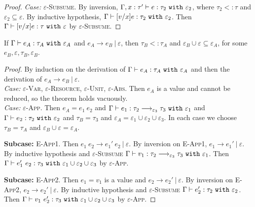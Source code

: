 \begin{appendix}
\begin{proof}
\textit{Case:} \textsc{$\varepsilon$-Subsume}. By inversion, $ \Gamma, x:  \tau' \vdash  e:  \tau_2~\mathtt{with}~ \varepsilon_2$, where $ \tau_2 <:  \tau$ and $\varepsilon_2 \subseteq \varepsilon$. By inductive hypothesis, $ \Gamma \vdash [ v/x] e:  \tau_2~\mathtt{with}~ \varepsilon_2$. Then $ \Gamma \vdash [ v/x] e:  \tau~\mathtt{with}~ \varepsilon$ by \textsc{$\varepsilon$-Subsume}.

\end{proof}


\hrulefill

\begin{theorem}
If $\Gamma \vdash e_A: \tau_A~\mathtt{with}~ \varepsilon_A$ and $e_A \longrightarrow e_B~|~\varepsilon$, then $\tau_B <: \tau_A$ and $\varepsilon_B \cup \varepsilon \subseteq \varepsilon_A$, for some $e_B, \varepsilon, \tau_B, \varepsilon_B$.
\end{theorem}


\begin{proof}
By induction on the derivation of $ \Gamma \vdash  e_A:  \tau_A~\mathtt{with}~ \varepsilon_A$ and then the derivation of $e_A \longrightarrow e_B~|~\varepsilon$.  \\

\textit{Case:} \textsc{$\varepsilon$-Var}, \textsc{$\varepsilon$-Resource}, \textsc{$\varepsilon$-Unit}, \textsc{$\varepsilon$-Abs}. Then $e_A$ is a value and cannot be reduced, so the theorem holds vacuously.\\

\textit{Case:} \textsc{$\varepsilon$-App}. Then $e_A =  e_1~ e_2$ and $\Gamma \vdash e_1:  \tau_2 \longrightarrow_{\varepsilon_3}  \tau_3~\mathtt{with}~ \varepsilon_1$ and $ \Gamma \vdash  e_2:  \tau_2~\mathtt{with}~ \varepsilon_2$ and $\tau_B = \tau_3$ and $\varepsilon_A = \varepsilon_1 \cup \varepsilon_2 \cup \varepsilon_3$.  In each case we choose $\tau_B = \tau_A$ and $\varepsilon_B \cup \varepsilon = \varepsilon_A$.

\textbf{Subcase:} \textsc{E-App1}. Then $e_1~e_2 \longrightarrow e_1'~e_2~|~\varepsilon$. By inversion on \textsc{E-App1}, $e_1 \longrightarrow e_1'~|~\varepsilon$. By inductive hypothesis and \textsc{$\varepsilon$-Subsume} $\Gamma \vdash v_1: \tau_2 \longrightarrow_{\varepsilon_3} \tau_3~\mathtt{with}~ \varepsilon_1$. Then $\Gamma \vdash e_1'~e_2: \tau_3~\mathtt{with}~ \varepsilon_1 \cup \varepsilon_2 \cup \varepsilon_3$ by \textsc{$\varepsilon$-App}.

\textbf{Subcase:} \textsc{E-App2}. Then $e_1 = v_1$ is a value and $e_2 \longrightarrow e_2'~|~\varepsilon$. By inversion on \textsc{E-App2}, $e_2 \longrightarrow e_2'~|~\varepsilon$. By inductive hypothesis and \textsc{$\varepsilon$-Subsume} $\Gamma \vdash e_2': \tau_2~\mathtt{with}~ \varepsilon_2$. Then $\Gamma \vdash v_1~e_2': \tau_3~\mathtt{with}~ \varepsilon_1 \cup \varepsilon_2 \cup \varepsilon_3$ by \textsc{$\varepsilon$-App}.


\end{proof}
\end{appendix}
